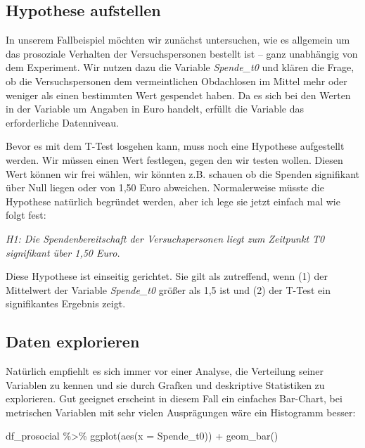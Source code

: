 \documentclass[
]{book}
\newenvironment{Shaded}{\begin{snugshade}}{\end{snugshade}}
\newcommand{\AttributeTok}[1]{\textcolor[rgb]{0.77,0.63,0.00}{#1}}
\newcommand{\FunctionTok}[1]{\textcolor[rgb]{0.00,0.00,0.00}{#1}}
\newcommand{\NormalTok}[1]{#1}
\newcommand{\SpecialCharTok}[1]{\textcolor[rgb]{0.00,0.00,0.00}{#1}}
\begin{document}
\hypertarget{hypothese-aufstellen}{%
\subsection{Hypothese aufstellen}\label{hypothese-aufstellen}}

In unserem Fallbeispiel möchten wir zunächst untersuchen, wie es allgemein um das prosoziale Verhalten der Versuchspersonen bestellt ist -- ganz unabhängig von dem Experiment. Wir nutzen dazu die Variable \emph{Spende\_t0} und klären die Frage, ob die Versuchspersonen dem vermeintlichen Obdachlosen im Mittel mehr oder weniger als einen bestimmten Wert gespendet haben. Da es sich bei den Werten in der Variable um Angaben in Euro handelt, erfüllt die Variable das erforderliche Datenniveau.

Bevor es mit dem T-Test losgehen kann, muss noch eine Hypothese aufgestellt werden. Wir müssen einen Wert festlegen, gegen den wir testen wollen. Diesen Wert können wir frei wählen, wir könnten z.B. schauen ob die Spenden signifikant über Null liegen oder von 1,50 Euro abweichen. Normalerweise müsste die Hypothese natürlich begründet werden, aber ich lege sie jetzt einfach mal wie folgt fest:

\emph{H1: Die Spendenbereitschaft der Versuchspersonen liegt zum Zeitpunkt T0 signifikant über 1,50 Euro.}

Diese Hypothese ist einseitig gerichtet. Sie gilt als zutreffend, wenn (1) der Mittelwert der Variable \emph{Spende\_t0} größer als 1,5 ist und (2) der T-Test ein signifikantes Ergebnis zeigt.

\hypertarget{daten-explorieren}{%
\subsection{Daten explorieren}\label{daten-explorieren}}

Natürlich empfiehlt es sich immer vor einer Analyse, die Verteilung seiner Variablen zu kennen und sie durch Grafken und deskriptive Statistiken zu explorieren. Gut geeignet erscheint in diesem Fall ein einfaches Bar-Chart, bei metrischen Variablen mit sehr vielen Ausprägungen wäre ein Histogramm besser:

\begin{Shaded}
\begin{Highlighting}[]
\NormalTok{df\_prosocial }\SpecialCharTok{\%\textgreater{}\%} 
  \FunctionTok{ggplot}\NormalTok{(}\FunctionTok{aes}\NormalTok{(}\AttributeTok{x =}\NormalTok{ Spende\_t0)) }\SpecialCharTok{+}
  \FunctionTok{geom\_bar}\NormalTok{() }
\end{Highlighting}
\end{Shaded}
\end{document}
